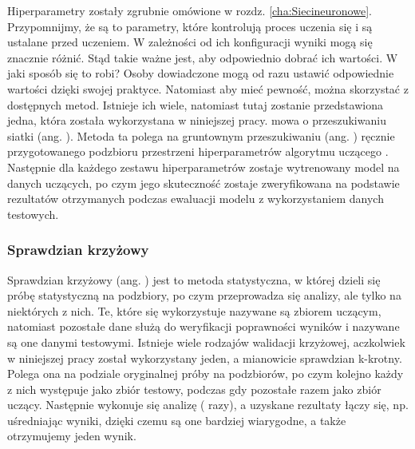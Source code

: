 Hiperparametry zostały zgrubnie omówione w rozdz. \ref{cha:Siecineuronowe}. Przypomnijmy, że są to parametry, które kontrolują proces uczenia się i są ustalane przed uczeniem. W zależności od ich konfiguracji wyniki mogą się znacznie różnić. Stąd takie ważne jest, aby odpowiednio dobrać ich wartości. W jaki sposób się to robi? Osoby dowiadczone mogą od razu ustawić odpowiednie wartości dzięki swojej praktyce. Natomiast aby mieć pewność, można skorzystać z dostępnych metod. Istnieje ich wiele, natomiast tutaj zostanie przedstawiona jedna, która została wykorzystana w niniejszej pracy. mowa o przeszukiwaniu siatki (ang. ). Metoda ta polega na gruntownym przeszukiwaniu (ang. ) ręcznie przygotowanego podzbioru przestrzeni hiperparametrów algorytmu uczącego \cite{Hsu03}. Następnie dla każdego zestawu hiperparametrów zostaje wytrenowany model na danych uczących, po czym jego skuteczność zostaje zweryfikowana na podstawie rezultatów otrzymanych podczas ewaluacji modelu z wykorzystaniem danych testowych.

\subsubsection{Sprawdzian krzyżowy}
\label{cross.validation}

Sprawdzian krzyżowy (ang. ) jest to metoda statystyczna, w której dzieli się próbę statystyczną na podzbiory, po czym przeprowadza się analizy, ale tylko na niektórych z nich. Te, które się wykorzystuje nazywane są zbiorem uczącym, natomiast pozostałe dane służą do weryfikacji poprawności wyników i nazywane są one danymi testowymi. Istnieje wiele rodzajów walidacji krzyżowej, aczkolwiek w niniejszej pracy został wykorzystany jeden, a mianowicie sprawdzian k-krotny. Polega ona na podziale oryginalnej próby na  podzbiorów, po czym kolejno każdy z nich występuje jako zbiór testowy, podczas gdy pozostałe razem jako zbiór uczący. Następnie wykonuje się analizę ( razy), a uzyskane  rezultaty łączy się, np. uśredniając wyniki, dzięki czemu są one bardziej wiarygodne, a także otrzymujemy jeden wynik.





